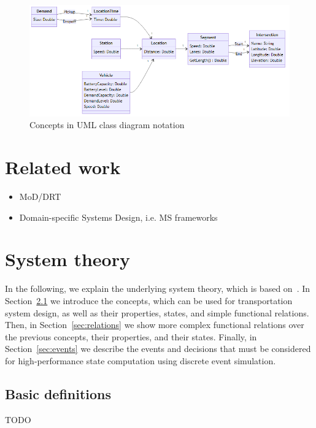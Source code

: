\documentclass{IEEEtran}
\begin{document}
    \begin{figure}[t]
        \centering
        \includegraphics[scale=0.5]{../../diagrams/model/classes-v0.png}
        \caption{Concepts in UML class diagram notation}
        \label{fig:concepts}
    \end{figure}

    \newpage

    \section{Related work}
    \label{sec:related}
    \begin{itemize}
    	\item MoD/DRT
    	\item Domain-specific Systems Design, i.e. MS frameworks
    \end{itemize}

    \newpage

    \section{System theory}
    
    \label{sec:theory}
    In the following, we explain the underlying system theory, which is based on~\cite{Ascher2014,Ascher2015,Ascher2016,Ascher2017}.
    In Section~\ref{sec:concepts} we introduce the concepts, which can be used for transportation system design, as well as their properties, states, and simple functional relations.
    Then, in Section~\ref{sec:relations} we show more complex functional relations over the previous concepts, their properties, and their states.
    Finally, in Section~\ref{sec:events} we describe the events and decisions that must be considered for high-performance state computation using discrete event simulation.

    \subsection{Basic definitions}
    \label{sec:concepts}
    TODO
\end{document}
